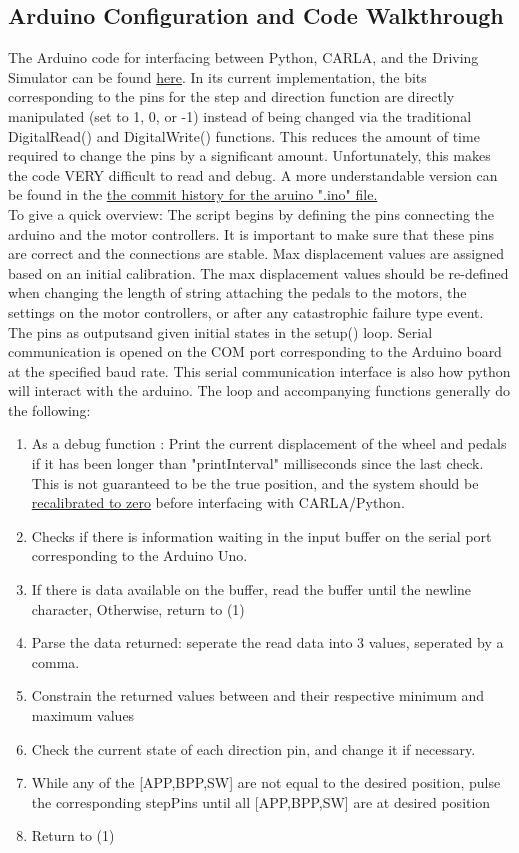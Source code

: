 \documentclass[12pt,oneside,letterpaper]{article}
\begin{document}
\subsection{Arduino Configuration and Code Walkthrough}
The Arduino code for interfacing between Python, CARLA, and the Driving Simulator can be found \href{https://github.com/hrwhite21/DriverlessDIL/blob/main/PythonToMotor/PythonToMotor.ino}{here}. In its current implementation, the bits corresponding to the pins for the step and direction function are directly manipulated (set to 1, 0, or -1) instead of being changed via the traditional DigitalRead() and DigitalWrite() functions. This reduces the amount of time required to change the pins by a significant amount. Unfortunately, this makes the code VERY difficult to read and debug. A more understandable version can be found in the \href{https://tinyurl.com/2s4kpnuv}{the commit history for the aruino ".ino" file.}
\\
To give a quick overview: The script begins by defining the pins connecting the arduino and the motor controllers. It is important to make sure that these pins are correct and the connections are stable. Max displacement values are assigned based on an initial calibration. The max displacement values should be re-defined when changing the length of string attaching the pedals to the motors, the settings on the motor controllers, or after any catastrophic failure type event. The pins as outputsand given initial states in the setup() loop. Serial communication is opened on the COM port corresponding to the Arduino board at the specified baud rate. This serial communication interface is also how python will interact with the arduino. The loop and accompanying functions generally do the following: 
\begin{enumerate}
\item As a debug function : Print the current displacement of the wheel and pedals if it has been longer than "printInterval" milliseconds since the last check. This is not guaranteed to be the true position, and the system should be \hyperref[sec:Calibration]{recalibrated to zero} before interfacing with CARLA/Python.
\item Checks if there is information waiting in the input buffer on the serial port corresponding to the Arduino Uno. 
\item If there is data available on the buffer, read the buffer until the newline character, Otherwise, return to (1)
\item Parse the data returned: seperate the read data into 3 values, seperated by a comma.
\item Constrain the returned values between and their respective minimum and maximum values
\item Check the current state of each direction pin, and change it if necessary.
\item While any of the [APP,BPP,SW] are not equal to the desired position, pulse the corresponding stepPins until all [APP,BPP,SW] are at desired position
\item Return to (1) 
\end{enumerate}
\end{document}
